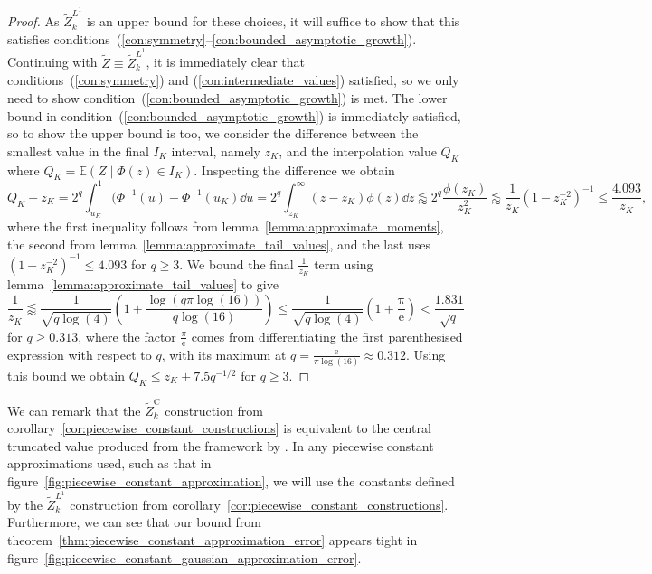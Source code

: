 \documentclass[manuscript,review]{acmart}
\begin{document}
\begin{proof}
As $ \tilde{Z}_k^{L^1} $ is an upper bound for these choices, it will suffice to show that this satisfies conditions~(\ref{con:symmetry}--\ref{con:bounded_asymptotic_growth}).  Continuing with $ \tilde{Z} \equiv  \tilde{Z}_k^{L^1}$, it is immediately clear that conditions~(\ref{con:symmetry}) and (\ref{con:intermediate_values}) satisfied, so we only need to show condition~(\ref{con:bounded_asymptotic_growth}) is met. The lower bound in condition~(\ref{con:bounded_asymptotic_growth}) is immediately satisfied, so to show the upper bound is too, we consider the difference between the smallest value in the final $ I_K $ interval, namely $ z_K $, and the interpolation value $ Q_K $ where $ Q_K = \mathbb{E}(Z \mid \Phi(z) \in I_K) $. Inspecting the difference we obtain
\begin{equation*}
Q_K - z_K = 2^q \int_{u_K}^{1} (\Phi^{-1}(u) - \Phi^{-1}(u_K) \dd{u} = 2^q \int_{z_K}^{\infty} (z - z_K) \phi(z) \dd{z} \lessapprox  2^q \dfrac{\phi(z_K)}{z_K^2} \lessapprox \dfrac{1}{z_K} (1 - z_K^{-2})^{-1} \leq \dfrac{4.093}{z_K},
\end{equation*}
where the first inequality follows from lemma~\ref{lemma:approximate_moments}, the second from lemma~\ref{lemma:approximate_tail_values}, and the last uses $ (1 - z_K^{-2})^{-1} \leq 4.093 $ for $ q \geq 3 $. We bound the final $ \tfrac{1}{z_K} $ term using lemma~\ref{lemma:approximate_tail_values} to give
\begin{equation*}
\dfrac{1}{z_K} \lessapprox \frac{1}{\sqrt{q\log(4)}} \left(1 + \frac{\log(q\pi\log(16))}{q\log(16)}\right) \leq  \frac{1}{\sqrt{q\log(4)}}\left(1 +  \frac{\mathrm{\pi}}{\mathrm{e}}\right) <  \frac{1.831}{\sqrt{q}}
\end{equation*}
for $ q \geq 0.313 $, where the factor $ \tfrac{\pi}{\mathrm{e}} $ comes from differentiating the first parenthesised expression with respect to $ q $, with its maximum at $ q = \tfrac{\mathrm{e}}{\pi\log(16)} \approx 0.312 $. Using this bound we obtain $ Q_K \leq z_K + 7.5 q^{-1/2} $ for $ q \geq 3 $. \qedhere
\end{proof}

We can remark that the $ \tilde{Z}_k^\mathrm{C} $ construction from corollary~\ref{cor:piecewise_constant_constructions} is equivalent to the central truncated value produced from the framework by \citet[(4)]{giles2019random_quadrature}. In any piecewise constant approximations used, such as that in figure~\ref{fig:piecewise_constant_approximation}, we will use the constants defined by  the $ \tilde{Z}_k^{L^1} $ construction from corollary~\ref{cor:piecewise_constant_constructions}. Furthermore, we can see that our bound from theorem~\ref{thm:piecewise_constant_approximation_error} appears tight in figure~\ref{fig:piecewise_constant_gaussian_approximation_error}.
\end{document}

